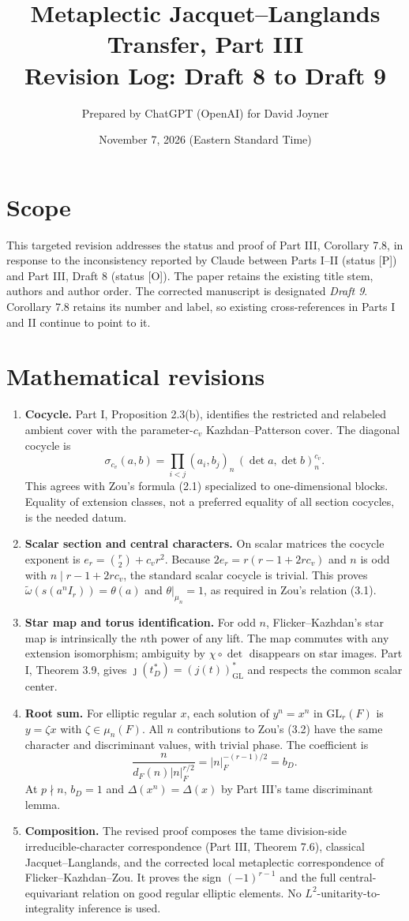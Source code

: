 \documentclass[11pt]{article}
\title{Metaplectic Jacquet--Langlands Transfer, Part III\\Revision Log: Draft 8 to Draft 9}
\author{Prepared by ChatGPT (OpenAI) for David Joyner}
\date{November 7, 2026 (Eastern Standard Time)}
\begin{document}
\maketitle
\section*{Scope}
This targeted revision addresses the status and proof of Part III, Corollary 7.8, in response to the inconsistency reported by Claude between Parts I--II (status [P]) and Part III, Draft 8 (status [O]). The paper retains the existing title stem, authors and author order. The corrected manuscript is designated \emph{Draft 9}. Corollary 7.8 retains its number and label, so existing cross-references in Parts I and II continue to point to it.
\section*{Mathematical revisions}
\begin{enumerate}[leftmargin=*]
\item \textbf{Cocycle.} Part I, Proposition 2.3(b), identifies the restricted and relabeled ambient cover with the parameter-$c_v$ Kazhdan--Patterson cover. The diagonal cocycle is
\[
\sigma_{c_v}(a,b)=\prod_{i<j}(a_i,b_j)_n\,(\det a,\det b)_n^{c_v}.
\]
This agrees with Zou's formula (2.1) specialized to one-dimensional blocks. Equality of extension classes, not a preferred equality of all section cocycles, is the needed datum.
\item \textbf{Scalar section and central characters.} On scalar matrices the cocycle exponent is $e_r=\binom r2+c_vr^2$. Because $2e_r=r(r-1+2rc_v)$ and $n$ is odd with $n\mid r-1+2rc_v$, the standard scalar cocycle is trivial. This proves $\widetilde\omega(s(a^nI_r))=\theta(a)$ and $\theta|_{\mu_n}=1$, as required in Zou's relation (3.1).
\item \textbf{Star map and torus identification.} For odd $n$, Flicker--Kazhdan's star map is intrinsically the $n$th power of any lift. The map commutes with any extension isomorphism; ambiguity by $\chi\circ\det$ disappears on star images. Part I, Theorem 3.9, gives $\jmath(t_D^*)=(j(t))_{\mathrm{GL}}^*$ and respects the common scalar center.
\item \textbf{Root sum.} For elliptic regular $x$, each solution of $y^n=x^n$ in $\mathrm{GL}_r(F)$ is $y=\zeta x$ with $\zeta\in\mu_n(F)$. All $n$ contributions to Zou's (3.2) have the same character and discriminant values, with trivial phase. The coefficient is
\[
\frac{n}{d_F(n)|n|_F^{r/2}}=|n|_F^{-(r-1)/2}=b_D.
\]
At $p\nmid n$, $b_D=1$ and $\Delta(x^n)=\Delta(x)$ by Part III's tame discriminant lemma.
\item \textbf{Composition.} The revised proof composes the tame division-side irreducible-character correspondence (Part III, Theorem 7.6), classical Jacquet--Langlands, and the corrected local metaplectic correspondence of Flicker--Kazhdan--Zou. It proves the sign $(-1)^{r-1}$ and the full central-equivariant relation on good regular elliptic elements. No $L^2$-unitarity-to-integrality inference is used.
\end{enumerate}
\end{document}
